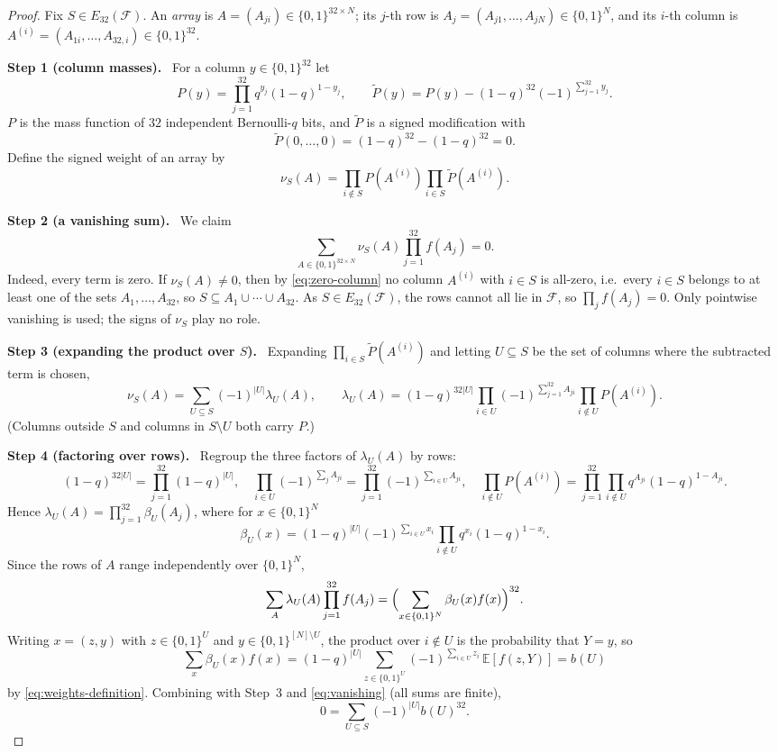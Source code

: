 \documentclass[11pt,letterpaper]{article}
\theoremstyle{definition}
\theoremstyle{remark}
\numberwithin{equation}{section}
\newcommand{\step}[1]{\par\medskip\noindent\textbf{#1}\ }
\begin{document}
\begin{proof}
Fix $S\in E_{32}(\mathcal F)$. An \emph{array} is
$A=(A_{ji})\in\{0,1\}^{32\times N}$; its $j$-th row is
$A_j=(A_{j1},\ldots,A_{jN})\in\{0,1\}^N$, and its $i$-th column is
$A^{(i)}=(A_{1i},\ldots,A_{32,i})\in\{0,1\}^{32}$.

\step{Step 1 (column masses).}
For a column $y\in\{0,1\}^{32}$ let
\[
 P(y)=\prod_{j=1}^{32}q^{y_j}(1-q)^{1-y_j},
 \qquad
 \widetilde P(y)=P(y)-(1-q)^{32}(-1)^{\sum_{j=1}^{32}y_j}.
\]
$P$ is the mass function of $32$ independent Bernoulli-$q$ bits, and
$\widetilde P$ is a signed modification with
\begin{equation}\label{eq:zero-column}
\widetilde P(0,\ldots,0)=(1-q)^{32}-(1-q)^{32}=0.
\end{equation}
Define the signed weight of an array by
\[
\nu_S(A)=\prod_{i\notin S}P(A^{(i)})\prod_{i\in S}\widetilde P(A^{(i)}).
\]

\step{Step 2 (a vanishing sum).}
We claim
\begin{equation}\label{eq:vanishing}
 \sum_{A\in\{0,1\}^{32\times N}}\nu_S(A)
 \prod_{j=1}^{32}f(A_j)=0 .
\end{equation}
Indeed, every term is zero. If $\nu_S(A)\ne0$, then by
\eqref{eq:zero-column} no column $A^{(i)}$ with $i\in S$ is all-zero, i.e.\
every $i\in S$ belongs to at least one of the sets $A_1,\ldots,A_{32}$, so
$S\subseteq A_1\cup\cdots\cup A_{32}$. As $S\in E_{32}(\mathcal F)$, the
rows cannot all lie in $\mathcal F$, so $\prod_jf(A_j)=0$. Only pointwise
vanishing is used; the signs of $\nu_S$ play no role.

\step{Step 3 (expanding the product over $S$).}
Expanding $\prod_{i\in S}\widetilde P(A^{(i)})$ and letting
$U\subseteq S$ be the set of columns where the subtracted term is chosen,
\[
\nu_S(A)=\sum_{U\subseteq S}(-1)^{|U|}\lambda_U(A),
\qquad
\lambda_U(A)=(1-q)^{32|U|}
\prod_{i\in U}(-1)^{\sum_{j=1}^{32}A_{ji}}
\prod_{i\notin U}P(A^{(i)}).
\]
(Columns outside $S$ and columns in $S\setminus U$ both carry $P$.)

\step{Step 4 (factoring over rows).}
Regroup the three factors of $\lambda_U(A)$ by rows:
\[
(1-q)^{32|U|}=\prod_{j=1}^{32}(1-q)^{|U|},\quad
\prod_{i\in U}(-1)^{\sum_{j}A_{ji}}
 =\prod_{j=1}^{32}(-1)^{\sum_{i\in U}A_{ji}},\quad
\prod_{i\notin U}P(A^{(i)})
 =\prod_{j=1}^{32}\prod_{i\notin U}q^{A_{ji}}(1-q)^{1-A_{ji}} .
\]
Hence $\lambda_U(A)=\prod_{j=1}^{32}\beta_U(A_j)$, where for
$x\in\{0,1\}^N$
\[
\beta_U(x)=(1-q)^{|U|}(-1)^{\sum_{i\in U}x_i}
\prod_{i\notin U}q^{x_i}(1-q)^{1-x_i}.
\]
Since the rows of $A$ range independently over $\{0,1\}^N$,
\[
\sum_{A}\lambda_U(A)\prod_{j=1}^{32}f(A_j)
=\Bigl(\sum_{x\in\{0,1\}^N}\beta_U(x)f(x)\Bigr)^{32}.
\]
Writing $x=(z,y)$ with $z\in\{0,1\}^U$ and
$y\in\{0,1\}^{[N]\setminus U}$, the product over $i\notin U$ is the
probability that $Y=y$, so
\[
\sum_{x}\beta_U(x)f(x)
=(1-q)^{|U|}\sum_{z\in\{0,1\}^U}(-1)^{\sum_{i\in U}z_i}\,
 \mathbb E[f(z,Y)]=b(U)
\]
by \eqref{eq:weights-definition}. Combining with Step~3 and
\eqref{eq:vanishing} (all sums are finite),
\begin{equation}\label{eq:signed-identity}
 0=\sum_{U\subseteq S}(-1)^{|U|}b(U)^{32}.
\end{equation}


\end{proof}
\end{document}
